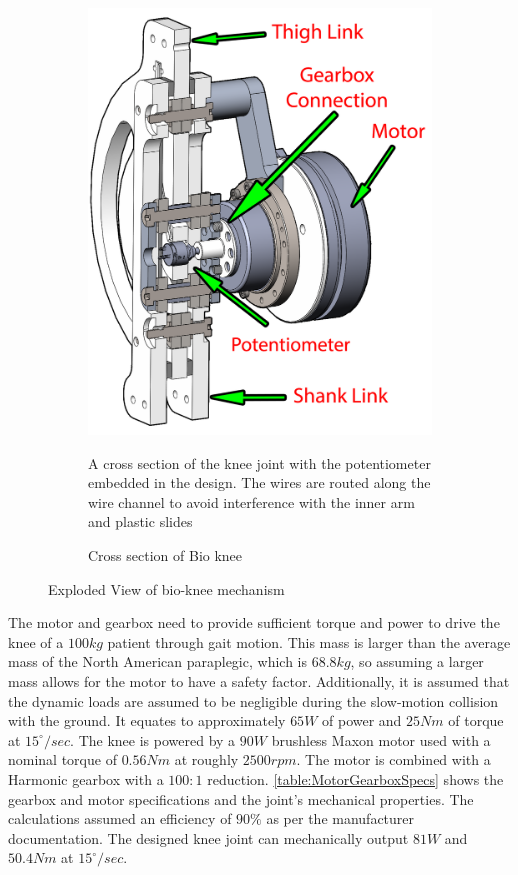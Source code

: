 \begin{figure}
\begin{subfigure}{\textwidth}
         \includegraphics[scale=0.2]{images/mech_design/KneeJointAssyCrossSection.png}
          \captionsetup{justification=centering}
        \caption{Cross section of Bio knee}{A cross section of the knee joint with the potentiometer embedded in the design. The wires are routed along the wire channel to avoid interference with the inner arm and plastic slides}
        \label{fig:CrossSectionPot}
    \end{subfigure}    
    \caption{Exploded View of bio-knee mechanism}
    \label{fig:bioknee}
\end{figure}

The motor and gearbox need to provide sufficient torque and power to drive the knee of a $100kg$ patient through gait motion. This mass is larger than the average mass of the North American paraplegic, which is $68.8kg$, so assuming a larger mass allows for the motor to have a safety factor. Additionally, it is assumed that the dynamic loads are assumed to be negligible during the slow-motion collision with the ground. It equates to approximately $65W$ of power and $25Nm$ of torque at \(15^\circ/sec\). The knee is powered by a $90W$ brushless Maxon motor used with a nominal torque of $0.56Nm$ at roughly $2500rpm$.  The motor is combined with a Harmonic gearbox with a $100:1$ reduction. \autoref{table:MotorGearboxSpecs} shows the gearbox and motor specifications and the joint's mechanical properties. The calculations assumed an efficiency of \(90\%\) as per the manufacturer documentation. The designed knee joint can mechanically output $81W$ and $50.4Nm$ at $15^\circ/sec$.  

